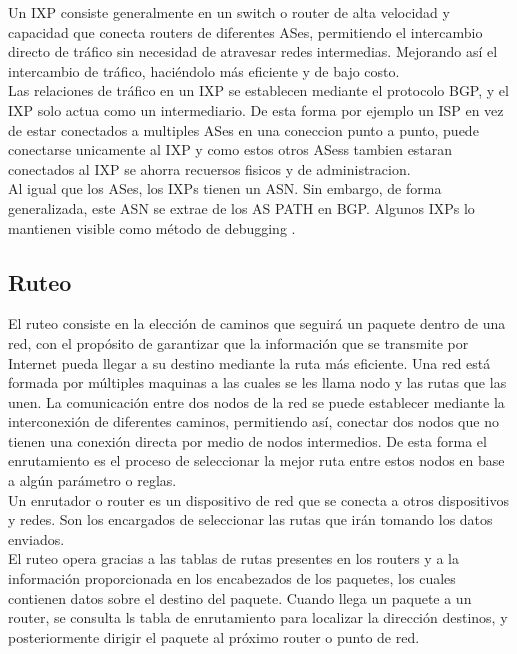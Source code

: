 Un IXP consiste generalmente en un switch  o router de alta velocidad y capacidad que conecta routers de diferentes ASes, permitiendo el intercambio directo de tráfico sin necesidad 
de atravesar redes intermedias. Mejorando así el intercambio de tráfico, haciéndolo más eficiente y de bajo costo.\\

Las relaciones de tráfico en un IXP se establecen mediante el protocolo BGP, y el IXP solo actua como un intermediario. 
De esta forma por ejemplo un ISP en vez de estar conectados a multiples ASes  en una coneccion punto a punto, puede conectarse 
unicamente al IXP y como estos otros ASess tambien estaran conectados al IXP se ahorra recuersos fisicos y de administracion.\\

Al igual que los ASes, los IXPs tienen un ASN. Sin embargo, de forma generalizada, este ASN se extrae de los AS PATH en BGP. 
Algunos IXPs lo mantienen visible como método de debugging \cite{InferringASRelatioships2001}. 


\subsection{Ruteo} \label{sec:anexo_ruteo}


El ruteo consiste en la elección de caminos que seguirá un paquete dentro de una red, con
el propósito de garantizar que la información que se transmite por Internet pueda llegar a
su destino mediante la ruta más eficiente. Una red está formada por múltiples maquinas a
las cuales se les llama nodo y las rutas que las unen. La comunicación entre dos nodos de
la red se puede establecer mediante la interconexión de diferentes caminos, permitiendo así,
conectar dos nodos que no tienen una conexión directa por medio de nodos intermedios. De
esta forma el enrutamiento es el proceso de seleccionar la mejor ruta entre estos nodos en
base a algún parámetro o reglas.\\

Un enrutador o router es un dispositivo de red que se conecta a otros dispositivos y redes.
Son los encargados de seleccionar las rutas que irán tomando los datos enviados.\\

El ruteo opera gracias a las tablas de rutas presentes en los routers y a la información
proporcionada en los encabezados de los paquetes, los cuales contienen datos sobre el destino
del paquete. Cuando llega un paquete a un router, se consulta ls tabla de enrutamiento para
localizar la dirección destinos, y posteriormente dirigir el paquete al próximo router o punto
de red.\\

